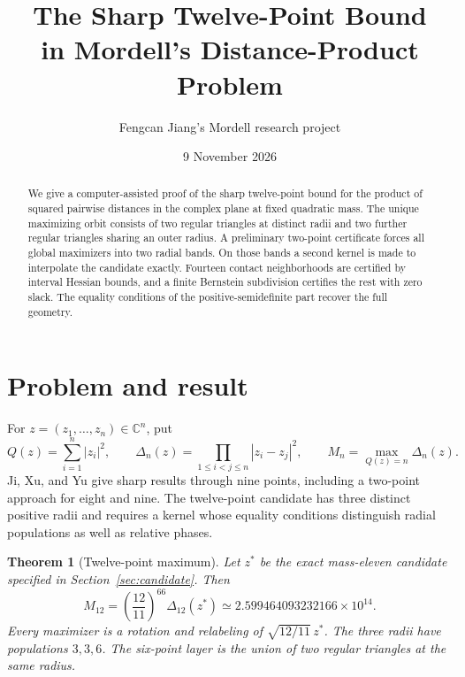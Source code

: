 \documentclass[11pt,letterpaper]{article}
\title{\bfseries The Sharp Twelve-Point Bound\\
  in Mordell's Distance-Product Problem}
\author{Fengcan Jiang's Mordell research project}
\date{9 November 2026}
\newtheorem{theorem}{Theorem}
\theoremstyle{remark}
\newcommand{\CC}{\mathbb C}
\begin{document}
\maketitle
\begin{abstract}
We give a computer-assisted proof of the sharp twelve-point bound for the product
of squared pairwise distances in the complex plane at fixed quadratic mass.
The unique maximizing orbit consists of two regular triangles at distinct radii
and two further regular triangles sharing an outer radius. A preliminary
two-point certificate forces all global maximizers into two radial bands. On
those bands a second kernel is made to interpolate the candidate exactly.
Fourteen contact neighborhoods are certified by interval Hessian bounds, and a
finite Bernstein subdivision certifies the rest with zero slack. The equality
conditions of the positive-semidefinite part recover the full geometry.
\end{abstract}

\section{Problem and result}
\label{sec:main}
For \(z=(z_1,\ldots,z_n)\in\CC^n\), put
\[
 Q(z)=\sum_{i=1}^n |z_i|^2,\qquad
 \Delta_n(z)=\prod_{1\le i<j\le n}|z_i-z_j|^2,\qquad
 M_n=\max_{Q(z)=n}\Delta_n(z).
\]
Ji, Xu, and Yu \cite{jxy} give sharp results through nine points, including a
two-point approach for eight and nine. The twelve-point candidate has three
distinct positive radii and requires a kernel whose equality conditions
distinguish radial populations as well as relative phases.

\begin{theorem}[Twelve-point maximum]\label{thm:main}
Let \(z^*\) be the exact mass-eleven candidate specified in
Section~\ref{sec:candidate}. Then
\[
 M_{12}=\left(\frac{12}{11}\right)^{66}\Delta_{12}(z^*)
       \simeq 2.599464093232166\times10^{14}.
\]
Every maximizer is a rotation and relabeling of \(\sqrt{12/11}\,z^*\).
The three radii have populations \(3,3,6\). The six-point layer is the
union of two regular triangles at the same radius.
\end{theorem}
\end{document}
